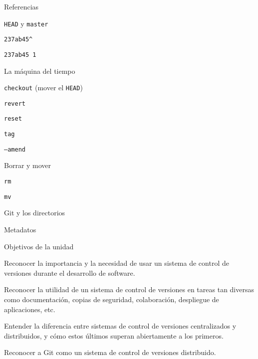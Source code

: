 \begin{longenum}
\begin{longenum}
\begin{longenum}
\begin{longenum}
            \end{longenum}
            \item Referencias
            \begin{longenum}
                \item \texttt{HEAD} y \texttt{master}
                \item \texttt{237ab45\^}
                \item \texttt{237ab45~1}
            \end{longenum}
        \end{longenum}
        \item La máquina del tiempo
        \begin{longenum}
            \item \texttt{checkout} (mover el \texttt{HEAD})
            \item \texttt{revert}
            \item \texttt{reset}
            \item \texttt{tag}
            \item \texttt{--amend}
        \end{longenum}
        \item Borrar y mover
        \begin{longenum}
            \item \texttt{rm}
            \item \texttt{mv}
        \end{longenum}
        \item Git y los directorios
        \item Metadatos
        \begin{longenum}
            \item Objetivos de la unidad
            \begin{longenum}
                \item Reconocer la importancia y la necesidad de usar un sistema de control de versiones durante el desarrollo de software.
                \item Reconocer la utilidad de un sistema de control de versiones en tareas tan diversas como documentación, copias de seguridad, colaboración, despliegue de aplicaciones, etc.
                \item Entender la diferencia entre sistemas de control de versiones centralizados y distribuidos, y cómo estos últimos superan abiertamente a los primeros.
                \item Reconocer a Git como un sistema de control de versiones distribuido.

\end{longenum}
\end{longenum}
\end{longenum}
\end{longenum}
